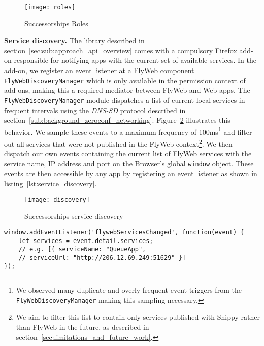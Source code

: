\begin{figure}[h]
    \centering
    \texttt{[image: roles]}
    \caption{Successorships Roles}
    \label{fig:roles}
\end{figure}

\noindent\textbf{Service discovery.} 
The \APIshort library described in section~\ref{sec:sub:approach_api_overview} comes with a compulsory Firefox add-on responsible for notifying apps with the current set of available \APIshort services. 
In the add-on, we register an event listener at a FlyWeb component \texttt{FlyWebDiscoveryManager} which is only available in the permission context of add-ons, making this a required mediator between FlyWeb and \APIshort Web apps. 
The \texttt{FlyWebDiscoveryManager} module dispatches a list of current local services in frequent intervals using the \textit{DNS-SD} protocol described in section~\ref{sub:background_zeroconf_networking}. Figure~\ref{fig:discovery} illustrates this behavior.
We sample these events to a maximum frequency of 100ms\footnote{We observed many duplicate and overly frequent event triggers from the \texttt{FlyWebDiscoveryManager} making this sampling necessary.} and filter out all services that were not published in the FlyWeb context\footnote{We aim to filter this list to contain only services published with Shippy rather than FlyWeb in the future, as described in section~\ref{sec:limitations_and_future_work}.}. 
We then dispatch our own events containing the current list of FlyWeb services with the service name, IP address and port on the Browser's global \texttt{window} object. 
These events are then accessible by any \APIshort app by registering an event listener as shown in listing~\ref{lst:service_discovery}.

\begin{figure}[h]
    \centering
    \texttt{[image: discovery]}
    \caption{Successorships service discovery}
    \label{fig:discovery}
\end{figure}

\begin{lstlisting}[caption={Event listener for service discovery},label={lst:service_discovery}]
window.addEventListener('flywebServicesChanged', function(event) {
    let services = event.detail.services;
    // e.g. [{ serviceName: "QueueApp",
    // serviceUrl: "http://206.12.69.249:51629" }]
});
\end{lstlisting}

